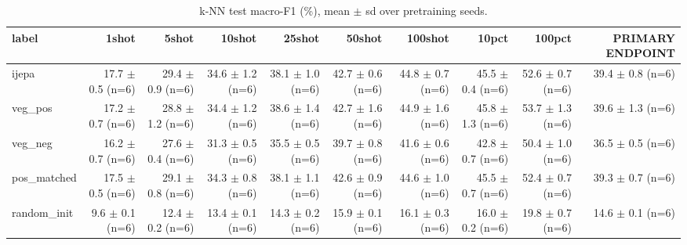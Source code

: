 \begin{table}[t]
\centering
\small
\caption{k-NN test macro-F1 (\%), mean $\pm$ sd over pretraining seeds.}
\label{tab:main_results_knn}
\begin{tabular}{lrrrrrrrrr}
\toprule
label & 1shot & 5shot & 10shot & 25shot & 50shot & 100shot & 10pct & 100pct & PRIMARY ENDPOINT \\
\midrule
ijepa & 17.7 $\pm$ 0.5 (n=6) & 29.4 $\pm$ 0.9 (n=6) & 34.6 $\pm$ 1.2 (n=6) & 38.1 $\pm$ 1.0 (n=6) & 42.7 $\pm$ 0.6 (n=6) & 44.8 $\pm$ 0.7 (n=6) & 45.5 $\pm$ 0.4 (n=6) & 52.6 $\pm$ 0.7 (n=6) & 39.4 $\pm$ 0.8 (n=6) \\
veg\_pos & 17.2 $\pm$ 0.7 (n=6) & 28.8 $\pm$ 1.2 (n=6) & 34.4 $\pm$ 1.2 (n=6) & 38.6 $\pm$ 1.4 (n=6) & 42.7 $\pm$ 1.6 (n=6) & 44.9 $\pm$ 1.6 (n=6) & 45.8 $\pm$ 1.3 (n=6) & 53.7 $\pm$ 1.3 (n=6) & 39.6 $\pm$ 1.3 (n=6) \\
veg\_neg & 16.2 $\pm$ 0.7 (n=6) & 27.6 $\pm$ 0.4 (n=6) & 31.3 $\pm$ 0.5 (n=6) & 35.5 $\pm$ 0.5 (n=6) & 39.7 $\pm$ 0.8 (n=6) & 41.6 $\pm$ 0.6 (n=6) & 42.8 $\pm$ 0.7 (n=6) & 50.4 $\pm$ 1.0 (n=6) & 36.5 $\pm$ 0.5 (n=6) \\
pos\_matched & 17.5 $\pm$ 0.5 (n=6) & 29.1 $\pm$ 0.8 (n=6) & 34.3 $\pm$ 0.8 (n=6) & 38.1 $\pm$ 1.1 (n=6) & 42.6 $\pm$ 0.9 (n=6) & 44.6 $\pm$ 1.0 (n=6) & 45.5 $\pm$ 0.7 (n=6) & 52.4 $\pm$ 0.7 (n=6) & 39.3 $\pm$ 0.7 (n=6) \\
random\_init & 9.6 $\pm$ 0.1 (n=6) & 12.4 $\pm$ 0.2 (n=6) & 13.4 $\pm$ 0.1 (n=6) & 14.3 $\pm$ 0.2 (n=6) & 15.9 $\pm$ 0.1 (n=6) & 16.1 $\pm$ 0.3 (n=6) & 16.0 $\pm$ 0.2 (n=6) & 19.8 $\pm$ 0.7 (n=6) & 14.6 $\pm$ 0.1 (n=6) \\
\bottomrule
\end{tabular}
\end{table}
